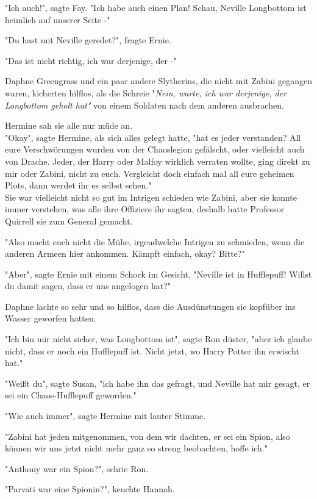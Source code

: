 {"Ich auch!", sagte Fay. "Ich habe auch einen Plan! Schau, Neville Longbottom ist heimlich auf unserer Seite -"

"Du hast mit Neville geredet?", fragte Ernie.

"Das ist nicht richtig, ich war derjenige, der -"

Daphne Greengrass und ein paar andere Slytherins, die nicht mit Zabini gegangen waren, kicherten hilflos, als die Schreie "\emph{Nein, warte, ich war derjenige, der Longbottom geholt hat"} von einem Soldaten nach dem anderen ausbrachen.

Hermine sah sie alle nur müde an.\\ "Okay", sagte Hermine, als sich alles gelegt hatte, "hat es jeder verstanden? All eure Verschwörungen wurden von der Chaoslegion gefälscht, oder vielleicht auch von Drache. Jeder, der Harry oder Malfoy wirklich verraten wollte, ging direkt zu mir oder Zabini, nicht zu euch. Vergleicht doch einfach mal all eure geheimen Plots, dann werdet ihr es selbst sehen."\\ Sie war vielleicht nicht so gut im Intrigen schieden wie Zabini, aber sie konnte immer verstehen, was alle ihre Offiziere ihr sagten, deshalb hatte Professor Quirrell sie zum General gemacht.

"Also macht euch nicht die Mühe, irgendwelche Intrigen zu schmieden, wenn die anderen Armeen hier ankommen. Kämpft einfach, okay? Bitte?"

"Aber", sagte Ernie mit einem Schock im Gesicht, "Neville ist in Hufflepuff! Willst du damit sagen, dass er uns angelogen hat?"

Daphne lachte so sehr und so hilflos, dass die Ausdünstungen sie kopfüber ins Wasser geworfen hatten.

"Ich bin mir nicht sicher, was Longbottom ist", sagte Ron düster, "aber ich glaube nicht, dass er noch ein Hufflepuff ist. Nicht jetzt, wo Harry Potter ihn erwischt hat."

"Weißt du", sagte Susan, "ich habe ihn das gefragt, und Neville hat mir gesagt, er sei ein Chaos-Hufflepuff geworden."

"Wie auch immer", sagte Hermine mit lauter Stimme.

"Zabini hat jeden mitgenommen, von dem wir dachten, er sei ein Spion, also können wir uns jetzt nicht mehr ganz so streng beobachten, hoffe ich."

"Anthony war ein Spion?", schrie Ron.

"Parvati war eine Spionin?", keuchte Hannah.

}
